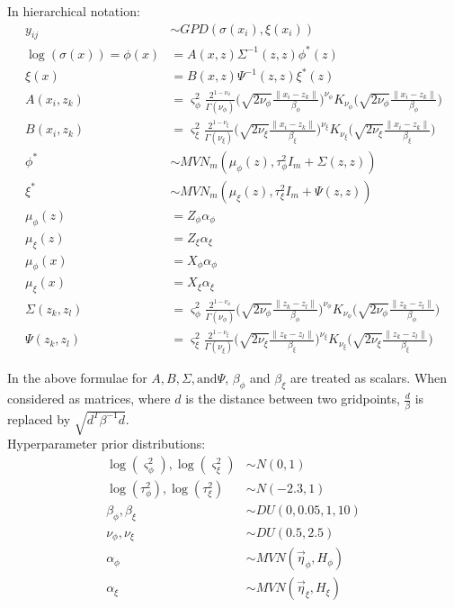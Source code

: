 \documentclass{article}
\begin{document}
In hierarchical notation:
\begin{align*}
y_{ij} &\sim GPD(\sigma(x_i), \xi(x_i)) \\
\log (\sigma (x)) = \phi(x) &= A(x, z) \Sigma^{-1}(z,z) \phi^*(z) \\
\xi (x) &= B(x, z) \Psi^{-1}(z,z) \xi^*(z) \\
A(x_i, z_k) &= \varsigma_\phi^2 \frac{2^{1-\nu_\phi}}{\Gamma(\nu_\phi)}\Bigg(\sqrt{2\nu_\phi}\frac{\|x_i - z_k\|}{\beta_\phi}\Bigg)^{\nu_\phi} K_{\nu_\phi}\Bigg(\sqrt{2\nu_\phi}\frac{\|x_i - z_k\|}{\beta_\phi}\Bigg)\\
B(x_i, z_k) &= \varsigma_\xi^2 \frac{2^{1-\nu_\xi}}{\Gamma(\nu_\xi)}\Bigg(\sqrt{2\nu_\xi}\frac{\|x_i - z_k\|}{\beta_\xi}\Bigg)^{\nu_\xi} K_{\nu_\xi}\Bigg(\sqrt{2\nu_\xi}\frac{\|x_i - z_k\|}{\beta_\xi}\Bigg)\\
\phi^* &\sim MVN_m(\mu_\phi(z), \tau_\phi^2 I_m + \Sigma(z, z))\\
\xi^* &\sim MVN_m(\mu_\xi(z), \tau_\xi^2 I_m + \Psi(z, z))\\
\mu_\phi (z) &= Z_\phi \alpha_\phi \\
\mu_\xi (z) &= Z_\xi \alpha_\xi \\
\mu_\phi(x) &= X_\phi \alpha_\phi \\
\mu_\xi(x) &= X_\xi \alpha_\xi \\
\Sigma(z_k, z_l) &= \varsigma_\phi^2 \frac{2^{1-\nu_\phi}}{\Gamma(\nu_\phi)}\Bigg(\sqrt{2\nu_\phi}\frac{\|z_k - z_l\|}{\beta_\phi}\Bigg)^{\nu_\phi} K_{\nu_\phi}\Bigg(\sqrt{2\nu_\phi}\frac{\|z_k - z_l\|}{\beta_\phi}\Bigg)\\
\Psi(z_k, z_l) &= \varsigma_\xi^2 \frac{2^{1-\nu_\xi}}{\Gamma(\nu_\xi)}\Bigg(\sqrt{2\nu_\xi}\frac{\|z_k - z_l\|}{\beta_\xi}\Bigg)^{\nu_\xi} K_{\nu_\xi}\Bigg(\sqrt{2\nu_\xi}\frac{\|z_k - z_l\|}{\beta_\xi}\Bigg)
\end{align*}

In the above formulae for $A, B, \Sigma, \text{and} \Psi$, $\beta_\phi$ and $\beta_\xi$ are treated as scalars. When considered as matrices, where $d$ is the distance between two gridpoints, $\frac{d}{\beta}$ is replaced by $\sqrt{d^T \beta^{-1} d}$.
\\

\clearpage
Hyperparameter prior distributions:
\begin{align*}
\log(\varsigma^2_\phi), \log(\varsigma^2_\xi)&\sim N(0, 1) \\
\log(\tau^2_\phi), \log(\tau^2_\xi) &\sim N(-2.3, 1) \\
\beta_\phi, \beta_\xi &\sim DU(0, 0.05, 1, 10)\\
\nu_\phi, \nu_\xi &\sim DU(0.5, 2.5)\\
\alpha_\phi &\sim MVN(\vec{\eta}_\phi, H_\phi)\\
\alpha_\xi &\sim MVN(\vec{\eta}_\xi, H_\xi)\\
\end{align*}
\end{document}
